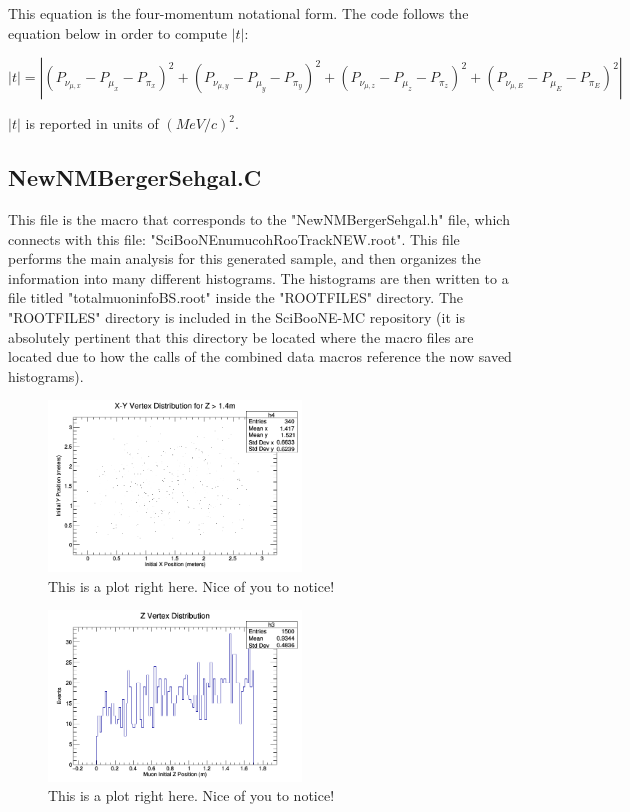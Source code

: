 \documentclass[11pt]{article}
\begin{document}
\noindent
This equation is the four-momentum notational form. The code follows the equation below in order to compute $|t|$:

\begin{equation}
|t| = |(P_{\nu_{\mu,x}} - P_{\mu_x} - P_{\pi_x})^2 + (P_{\nu_{\mu,y}} - P_{\mu_y} - P_{\pi_y})^2 + (P_{\nu_{\mu,z}} - P_{\mu_z} - P_{\pi_z})^2 + (P_{\nu_{\mu,E}} - P_{\mu_E} - P_{\pi_E})^2|
\end{equation}

\noindent
$|t|$ is reported in units of $(MeV/c)^2$.

\subsection{NewNMBergerSehgal.C}
This file is the macro that corresponds to the "NewNMBergerSehgal.h" file, which connects with this file: "SciBooNE\textunderscore numu\textunderscore coh\textunderscore RooTrack\textunderscore NEW.root". This file performs the main analysis for this generated sample, and then organizes the information into many different histograms. The histograms are then written to a file titled "totalmuoninfoBS.root" inside the "ROOTFILES" directory. The "ROOTFILES" directory is included in the SciBooNE-MC repository (it is absolutely pertinent that this directory be located where the macro files are located due to how the calls of the combined data macros reference the now saved histograms).

\begin{figure}[H]
\centering
\includegraphics[width=0.6\textwidth]{NewNMBergerSehgalImages/1-X-YVertexDistributionNMBS.png}
\caption{This is a plot right here. Nice of you to notice!}
\end{figure}

\begin{figure}[H]
\centering
\includegraphics[width=0.6\textwidth]{NewNMBergerSehgalImages/2-ZVertexDistributionNMBS.png}
\caption{This is a plot right here. Nice of you to notice!}
\end{figure}
\end{document}
